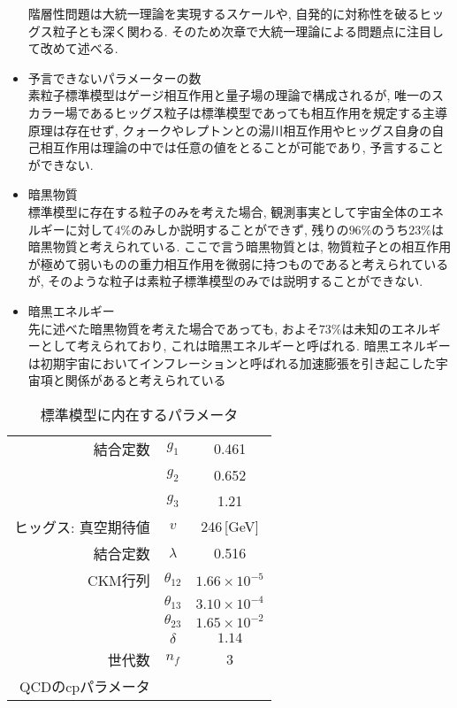 \begin{itemize}
            階層性問題は大統一理論を実現するスケールや, 自発的に対称性を破るヒッグス粒子とも深く関わる.
            そのため次章で大統一理論による問題点に注目して改めて述べる.
      \item 予言できないパラメーターの数\\
            素粒子標準模型はゲージ相互作用と量子場の理論で構成されるが, 唯一のスカラー場であるヒッグス粒子は標準模型であっても相互作用を規定する主導原理は存在せず, クォークやレプトンとの湯川相互作用やヒッグス自身の自己相互作用は理論の中では任意の値をとることが可能であり, 予言することができない.
      \item 暗黒物質\\
            標準模型に存在する粒子のみを考えた場合, 観測事実として宇宙全体のエネルギーに対して$4\%$のみしか説明することができず, 残りの$96\%$のうち$23\%$は暗黒物質と考えられている.
	    ここで言う暗黒物質とは, 物質粒子との相互作用が極めて弱いものの重力相互作用を微弱に持つものであると考えられているが, そのような粒子は素粒子標準模型のみでは説明することができない.
      \item 暗黒エネルギー\\
            先に述べた暗黒物質を考えた場合であっても, およそ$73\%$は未知のエネルギーとして考えられており, これは暗黒エネルギーと呼ばれる.
	    暗黒エネルギーは初期宇宙においてインフレーションと呼ばれる加速膨張を引き起こした宇宙項と関係があると考えられている
\end{itemize}
\begin{table}[ht]
  \caption{標準模型に内在するパラメータ}
  \begin{center}
    \begin{tabular}{r|cc}\hline\hline
      結合定数 & $g_1$ & 0.461  \\
               & $g_2$ & 0.652  \\
               & $g_3$ & 1.21   \\\hline
      ヒッグス: 真空期待値 & $v$  & 246\,[GeV]\\
                結合定数   &$\lambda$  & 0.516 \\\hline
                CKM行列 & $\theta_{12}$ & $ 1.66\times 10^{-5}$ \\
                        & $\theta_{13}$ & $ 3.10\times 10^{-4}$ \\
                        & $\theta_{23}$ & $ 1.65\times 10^{-2}$ \\
                        & $\delta$      & $ 1.14 $ \\
      世代数  & $n_f$ & 3 \\ 
      QCDのcpパラメータ & &
    \end{tabular}
  \end{center}
\end{table}

